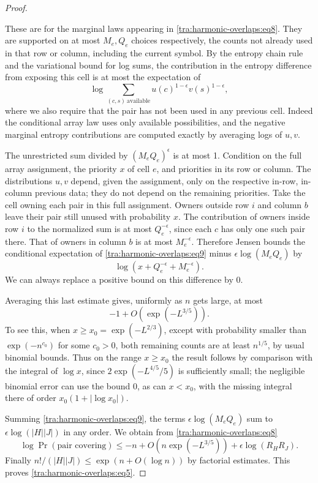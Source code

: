 \begin{proof}
\begin{itemize}
\end{itemize}
These are for the marginal laws appearing in \eqref{tra:harmonic-overlaps:eq8}. They are supported on at most \(M_e,Q_e\) choices respectively, the counts not already used in that row or column, including the current symbol. By the entropy chain rule and the variational bound for log sums, the contribution in the entropy difference from exposing this cell is at most the expectation of
\begin{equation}
            \log\sum_{(c,s)\ \mathrm{available}} u(c)^{1-\epsilon}
                                                       v(s)^{1-\epsilon},   \label{tra:harmonic-overlaps:eq9}
\end{equation}
where we also require that the pair has not been used in any previous cell. Indeed the conditional array law uses only available possibilities, and the negative marginal entropy contributions are computed exactly by averaging logs of \(u,v\).

The unrestricted sum divided by \((M_e Q_e)^\epsilon\) is at most 1. Condition on the full array assignment, the priority \(x\) of cell \(e\), and priorities in its row or column. The distributions \(u,v\) depend, given the assignment, only on the respective in-row, in-column previous data; they do not depend on the remaining priorities. Take the cell owning each pair in this full assignment. Owners outside row \(i\) and column \(b\) leave their pair still unused with probability \(x\). The contribution of owners inside row \(i\) to the normalized sum is at most \(Q_e^{-\epsilon}\), since each \(c\) has only one such pair there. That of owners in column \(b\) is at most \(M_e^{-\epsilon}\). Therefore Jensen bounds the conditional expectation of \eqref{tra:harmonic-overlaps:eq9} minus \(\epsilon\log(M_e Q_e)\) by
\[
                        \log(x+Q_e^{-\epsilon}+M_e^{-\epsilon}).
\]
We can always replace a positive bound on this difference by 0.

Averaging this last estimate gives, uniformly as \(n\) gets large, at most
\[
                              -1+O(\exp(-L^{3/5})).
\]
To see this, when \(x\ge x_0=\exp(-L^{2/3})\), except with probability smaller than \(\exp(-n^{c_0})\) for some \(c_0>0\), both remaining counts are at least \(n^{1/5}\), by usual binomial bounds. Thus on the range \(x\ge x_0\) the result follows by comparison with the integral of \(\log x\), since \(2\exp(-L^{4/5}/5)\) is sufficiently small; the negligible binomial error can use the bound 0, as can \(x<x_0\), with the missing integral there of order \(x_0(1+|\log x_0|)\).

Summing \eqref{tra:harmonic-overlaps:eq9}, the terms \(\epsilon\log(M_e Q_e)\) sum to \(\epsilon\log(|H||J|)\) in any order. We obtain from \eqref{tra:harmonic-overlaps:eq8}
\[
 \log\Pr(\text{pair covering})\le
           -n+O(n\exp(-L^{3/5}))+\epsilon\log(R_HR_J).
\]
Finally \(n!/(|H||J|)\le \exp(n+O(\log n))\) by factorial estimates. This proves \eqref{tra:harmonic-overlaps:eq5}.

\end{proof}

